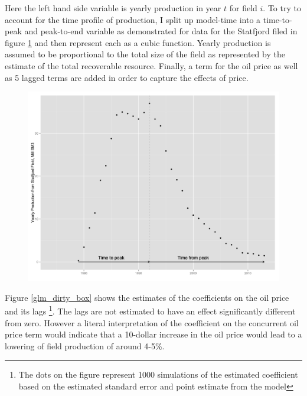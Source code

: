 \documentclass[12pt]{article}
\begin{document}
Here the left hand side variable is yearly production in year $t$ for field $i$.  To try to account for the time profile of production, I split up model-time into a time-to-peak and peak-to-end variable as demonstrated for data for the Statfjord filed in figure \ref{statfjord_dem} and then represent each as a cubic function.  Yearly production is assumed to be proportional to the total size of the field as represented by the estimate of the total recoverable resource.  Finally, a term for the oil price as well as 5 lagged terms are added in order to capture the effects of price.  

\begin{figure}
\includegraphics[width=1\textwidth]{figures/statfjord_dem_print.png}
\caption{}
\label{statfjord_dem}
\end{figure}

Figure \ref{glm_dirty_box} shows the estimates of the coefficients on the oil price and its lags \footnote{The dots on the figure represent 1000 simulations of the estimated coefficient based on the estimated standard error and point estimate from the model}.  The lags are not estimated to have an effect significantly different from zero. However a literal interpretation of the coefficient on the concurrent oil price term would indicate that a 10-dollar increase in the oil price would lead to a lowering of field production of around 4-5\%.
\end{document}
